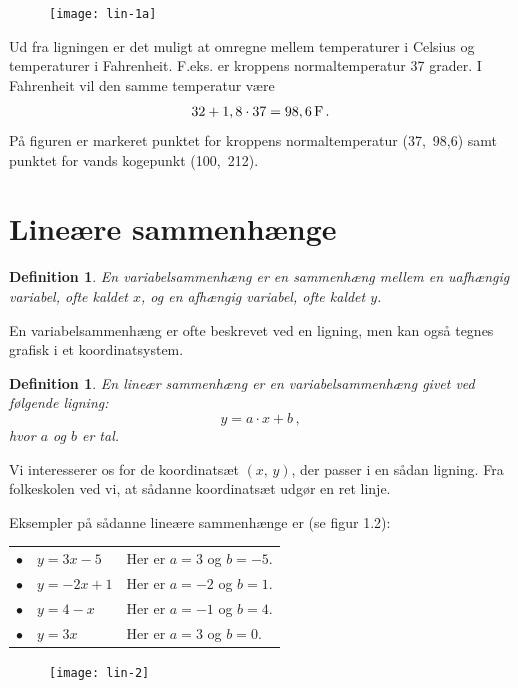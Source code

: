 \documentclass[12pt,oneside,a4paper]{article}
\newtheorem{mydef}[thm]{Definition}
\begin{document}
\begin{figure}[H]
    \centering
    \texttt{[image: lin-1a]}
\end{figure}

Ud fra ligningen er det muligt at omregne mellem temperaturer i Celsius og
temperaturer i Fahrenheit. F.eks.  er kroppens normaltemperatur 37 grader. I
Fahrenheit vil den samme temperatur være
\[
    32 + 1,8\cdot 37 = 98,6\, {\rm F} \,.
\]
På figuren er markeret punktet for kroppens normaltemperatur (37,\, 98,6) samt
punktet for vands kogepunkt (100,\, 212).



\section{Lineære sammenhænge}
\begin{mydef}
    En {\em variabelsammenhæng} er en sammenhæng mellem en uafhængig variabel, ofte
    kaldet $x$, og en afhængig variabel, ofte kaldet $y$.
\end{mydef}

En variabelsammenhæng er ofte beskrevet ved en ligning, men kan også tegnes grafisk i et
koordinatsystem.

\begin{mydef}
    En {\em lineær sammenhæng} er en variabelsammenhæng givet ved følgende ligning:
    $$
    y = a\cdot x + b \,,
    $$
    hvor $a$ og $b$ er tal.
\end{mydef}

Vi interesserer os for de koordinatsæt $(x,\,y)$, der passer i en sådan ligning.
Fra folkeskolen ved vi, at sådanne koordinatsæt udgør en ret linje.

Eksempler på sådanne lineære sammenhænge er (se figur 1.2):

\begin{tabular}{ll}
    $\bullet\quad y=3x-5$  & Her er $a=3$ og $b=-5$. \\
    $\bullet\quad y=-2x+1$ & Her er $a=-2$ og $b=1$. \\
    $\bullet\quad y=4-x$   & Her er $a=-1$ og $b=4$. \\
    $\bullet\quad y=3x$    & Her er $a=3$ og $b=0$.
\end{tabular}

\begin{figure}[H]
    \centering
    \texttt{[image: lin-2]}
\end{figure}
\end{document}

